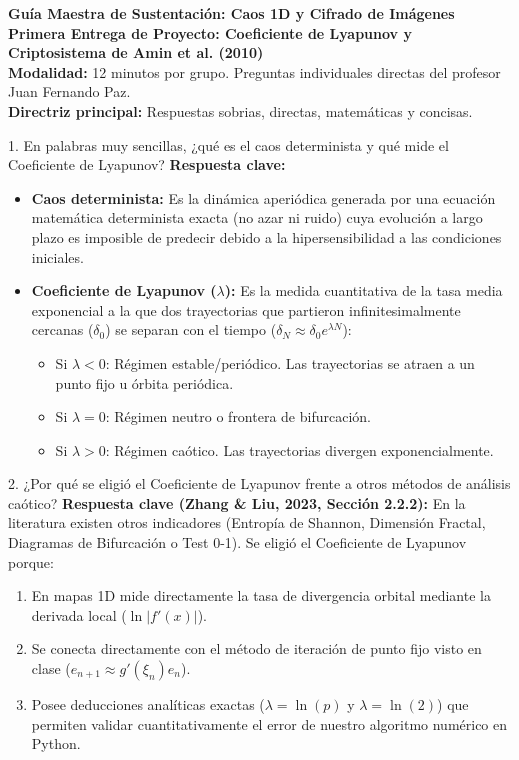 \documentclass[11pt,letterpaper]{article}
\begin{document}
\begin{center}
    {\Large \textbf{Guía Maestra de Sustentación: Caos 1D y Cifrado de Imágenes}}\\[0.15cm]
    {\large \textbf{Primera Entrega de Proyecto: Coeficiente de Lyapunov y Criptosistema de Amin et al. (2010)}}\\[0.1cm]
    \small \textbf{Modalidad:} 12 minutos por grupo. Preguntas individuales directas del profesor Juan Fernando Paz. \\
    \textbf{Directriz principal:} Respuestas sobrias, directas, matemáticas y concisas.
\end{center}
\vspace{0.2cm}

\begin{pregunta}{1. En palabras muy sencillas, ¿qué es el caos determinista y qué mide el Coeficiente de Lyapunov?}
\textbf{Respuesta clave:}
\begin{itemize}
    \item \textbf{Caos determinista:} Es la dinámica aperiódica generada por una ecuación matemática determinista exacta (no azar ni ruido) cuya evolución a largo plazo es imposible de predecir debido a la hipersensibilidad a las condiciones iniciales.
    \item \textbf{Coeficiente de Lyapunov ($\lambda$):} Es la medida cuantitativa de la tasa media exponencial a la que dos trayectorias que partieron infinitesimalmente cercanas ($\delta_0$) se separan con el tiempo ($\delta_N \approx \delta_0 e^{\lambda N}$):
    \begin{itemize}
        \item Si $\lambda < 0$: Régimen estable/periódico. Las trayectorias se atraen a un punto fijo u órbita periódica.
        \item Si $\lambda = 0$: Régimen neutro o frontera de bifurcación.
        \item Si $\lambda > 0$: Régimen caótico. Las trayectorias divergen exponencialmente.
    \end{itemize}
\end{itemize}
\end{pregunta}

\begin{pregunta}{2. ¿Por qué se eligió el Coeficiente de Lyapunov frente a otros métodos de análisis caótico?}
\textbf{Respuesta clave (Zhang \& Liu, 2023, Sección 2.2.2):}  
En la literatura existen otros indicadores (Entropía de Shannon, Dimensión Fractal, Diagramas de Bifurcación o Test 0-1). Se eligió el Coeficiente de Lyapunov porque:
\begin{enumerate}
    \item En mapas 1D mide directamente la tasa de divergencia orbital mediante la derivada local ($\ln|f'(x)|$).
    \item Se conecta directamente con el método de iteración de punto fijo visto en clase ($e_{n+1} \approx g'(\xi_n)e_n$).
    \item Posee deducciones analíticas exactas ($\lambda = \ln(p)$ y $\lambda = \ln(2)$) que permiten validar cuantitativamente el error de nuestro algoritmo numérico en Python.
\end{enumerate}
\end{pregunta}
\end{document}
